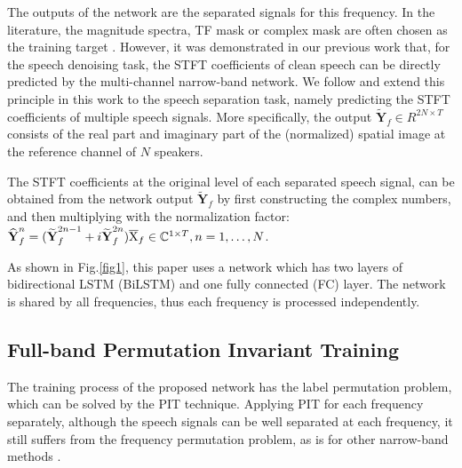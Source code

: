 \documentclass{article}
\begin{document}
The outputs of the network are the separated signals for this frequency.
In the literature, the magnitude spectra, TF mask or complex mask are often chosen as the training target \cite{wang_supervised_2018}.
However, it was demonstrated in our previous work \cite{li_narrow-band_2019} that, for the speech denoising task, the STFT coefficients of clean speech can be directly predicted by the multi-channel narrow-band network.
We follow and extend this principle in this work to the speech separation task, namely predicting the STFT coefficients of multiple speech signals. 
More specifically, the output $\widetilde{\mathbf{Y}}_{f}\in R^{2N\times T}$ consists of the real part and imaginary part of the (normalized) spatial image at the reference channel of $N$ speakers. 

The STFT coefficients at the original level of each separated speech signal, can be obtained from the network output $\widetilde{\mathbf{Y}}_f$ by first constructing the complex numbers, and then multiplying with the normalization factor: $\boldsymbol{\widehat{{\rm Y}}}_{f}^n = (\boldsymbol{\widetilde{{\rm Y}}}_{f}^{2n-1}+i\boldsymbol{\widetilde{{\rm Y}}}_{f}^{2n}) \overline{{\rm X}}_{f} \in \mathbb{C}^{1\times T}, n=1,\dots,N$.


As shown in Fig.\ref{fig1}, this paper uses a network which has two layers of bidirectional LSTM (BiLSTM) and one fully connected (FC) layer.
The network is shared by all frequencies, thus each frequency is processed independently.

\vspace*{-3mm}
\subsection{Full-band Permutation Invariant Training}

\vspace*{-1mm}
The training process of the proposed network has the label permutation problem, which can be solved by the PIT technique.
Applying PIT for each frequency separately, although the speech signals can be well separated at each frequency, it still suffers from the frequency permutation problem, as is for other narrow-band methods \cite{winter_map-based_2006, gannot_consolidated_2017, boeddecker_front-end_2018}.
\end{document}
